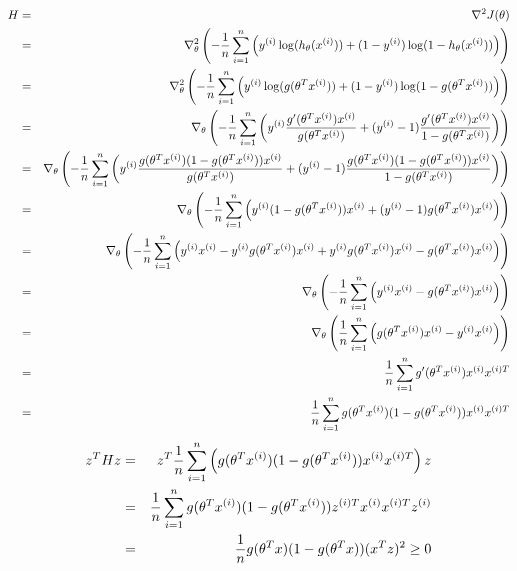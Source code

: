 \begin{answer}
\begin{eqnarray*}
H&=&\nabla^2J(\theta)\\
&=&\nabla_\theta^2\left(-\frac{1}{{n}}\sum_{i=1}^{n}\left(y^{(i)}\log(h_{\theta}(x^{(i)}))+(1-y^{(i)})\log(1-h_{\theta}(x^{(i)}))\right)\right)\\
&=&\nabla_\theta^2\left(-\frac{1}{{n}}\sum_{i=1}^{n}\left(y^{(i)}\log(g(\theta^T x^{(i)}))+(1-y^{(i)})\log(1-g(\theta^T x^{(i)}))\right)\right)\\
&=&\nabla_\theta\left(-\frac{1}{{n}}\sum_{i=1}^{n}\left(y^{(i)}\frac{g'(\theta^T x^{(i)})x^{(i)}}{g(\theta^T x^{(i)})}+(y^{(i)}-1)\frac{g'(\theta^T x^{(i)})x^{(i)}}{1-g(\theta^T x^{(i)})}\right)\right)\\
&=&\nabla_\theta\left(-\frac{1}{{n}}\sum_{i=1}^{n}\left(y^{(i)}\frac{g(\theta^T x^{(i)})(1-g(\theta^T x^{(i)}))x^{(i)}}{g(\theta^T x^{(i)})}+(y^{(i)}-1)\frac{g(\theta^T x^{(i)})(1-g(\theta^T x^{(i)}))x^{(i)}}{1-g(\theta^T x^{(i)})}\right)\right)\\
&=&\nabla_\theta\left(-\frac{1}{{n}}\sum_{i=1}^{n}\left(y^{(i)}(1-g(\theta^T x^{(i)}))x^{(i)}+(y^{(i)}-1)g(\theta^T x^{(i)})x^{(i)}\right)\right)\\
&=&\nabla_\theta\left(-\frac{1}{{n}}\sum_{i=1}^{n}\left(y^{(i)}x^{(i)}-y^{(i)}g(\theta^T x^{(i)})x^{(i)}+y^{(i)}g(\theta^T x^{(i)})x^{(i)}-g(\theta^T x^{(i)})x^{(i)}\right)\right)\\
&=&\nabla_\theta\left(-\frac{1}{{n}}\sum_{i=1}^{n}\left(y^{(i)}x^{(i)}-g(\theta^T x^{(i)})x^{(i)}\right)\right)\\
&=&\nabla_\theta\left(\frac{1}{{n}}\sum_{i=1}^{n}\left(g(\theta^T x^{(i)})x^{(i)}-y^{(i)}x^{(i)}\right)\right)\\
&=&\frac{1}{{n}}\sum_{i=1}^{{n}}g'(\theta^T x^{(i)})x^{(i)}x^{(i)T}\\
&=&\frac{1}{{n}}\sum_{i=1}^{{n}}g(\theta^T x^{(i)})(1-g(\theta^T x^{(i)}))x^{(i)}x^{(i)T}
\end{eqnarray*}
\begin{eqnarray*}
z^THz&=&z^T\frac{1}{{n}}\sum_{i=1}^{n}\left(g(\theta^T x^{(i)})(1-g(\theta^T x^{(i)}))x^{(i)}x^{(i)T}\right)z\\
&=&\frac{1}{{n}}\sum_{i=1}^{{n}}g(\theta^T x^{(i)})(1-g(\theta^T x^{(i)}))z^{(i)T}x^{(i)}x^{(i)T}z^{(i)}\\
&=&\frac{1}{{n}}g(\theta^T x)(1-g(\theta^T x))(x^{T}z)^2\geq0
\end{eqnarray*}
\end{answer}
